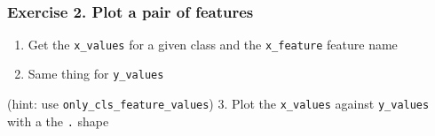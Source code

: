\documentclass[8pt]{extarticle}
\providecommand{\tightlist}{%
      \setlength{\itemsep}{0pt}\setlength{\parskip}{0pt}}
\begin{document}
    \begin{center}
    \end{center}
    { \hspace*{\fill} \\}
    
    \subsubsection{Exercise 2. Plot a pair of
features}\label{exercise-2.-plot-a-pair-of-features}

\begin{enumerate}
\def\labelenumi{\arabic{enumi}.}
\tightlist
\item
  Get the \texttt{x\_values} for a given class and the
  \texttt{x\_feature} feature name
\item
  Same thing for \texttt{y\_values}
\end{enumerate}

(hint: use \texttt{only\_cls\_feature\_values}) 3. Plot the
\texttt{x\_values} against \texttt{y\_values} with a the
\texttt{\textquotesingle{}.\textquotesingle{}} shape
\end{document}
